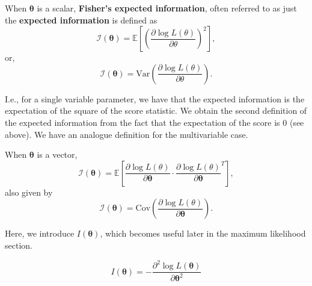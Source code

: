 \begin{definition}\label{defn:expected information sing}
    When \(\bm{\theta}\) is a scalar, \textbf{Fisher's expected information}, often referred to as just the \textbf{expected information} is defined as 
    \begin{equation}\label{eq:expected info sing E score}
        \mathscr{I}(\bm{\theta}) = \mathbb{E}\left[{\left(\frac{\partial \log L(\theta)}{\partial \theta}\right)}^2\right],
    \end{equation}
    or, 
    \begin{equation}\label{eq:expected info sing Var score}
        \mathscr{I}(\bm{\theta}) = \text{Var}\left(\frac{\partial \log L(\theta)}{\partial \theta}\right).
    \end{equation}
\end{definition}

I.e., for a single variable parameter, we have that the expected information is the expectation of the square of the score statistic. 
We obtain the second definition of the expected information from the fact that the expectation of the score is \(0\) (see above). 
We have an analogue definition for the multivariable case. 

\begin{definition}\label{defn:expected information multi}
    When \(\bm{\theta}\) is a vector,  
    \begin{equation}\label{eq:expected info multi E score}
        \mathscr{I}(\bm{\theta}) = \mathbb{E}\left[\frac{\partial \log L(\theta)}{\partial \bm{\theta}} \cdot \frac{\partial \log L(\theta)}{\partial \bm{\theta}}^T\right],
    \end{equation}
    also given by 
    \begin{equation}\label{eq:expected info multi Cov score}
        \mathscr{I}(\bm{\theta}) = \text{Cov}\left(\frac{\partial \log L(\theta)}{\partial \bm{\theta}}\right).
    \end{equation}
\end{definition}

Here, we introduce \(I(\bm{\theta})\), which becomes useful later in the maximum likelihood section.

\begin{equation}\label{eq:I}
    I(\bm{\theta}) = -\frac{\partial^2 \log L(\bm{\theta})}{\partial \bm{\theta}^2}
\end{equation}

